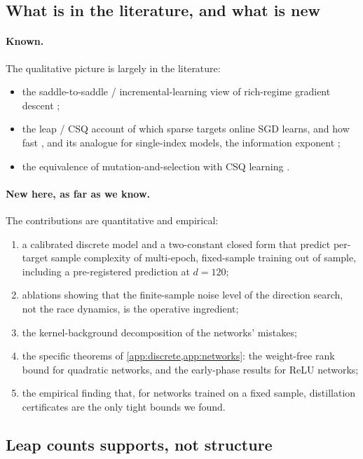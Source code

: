 \subsection{What is in the literature, and what is new}

\paragraph{Known.} The qualitative picture is largely in the literature:
\begin{itemize}
\item the saddle-to-saddle / incremental-learning view of rich-regime gradient descent \cite{pesme2023saddle,jacot2021saddle,li2021greedy,kunin2025agf,bantzis2025saddle};
\item the leap / CSQ account of which sparse targets online SGD learns, and how fast \cite{abbe2022msp,abbe2023leap}, and its analogue for single-index models, the information exponent \cite{benarous2021online};
\item the equivalence of mutation-and-selection with CSQ learning \cite{feldman2008evolvability}.
\end{itemize}

\paragraph{New here, as far as we know.} The contributions are quantitative and empirical:
\begin{enumerate}
\item a calibrated discrete model and a two-constant closed form that predict per-target sample complexity of multi-epoch, fixed-sample training out of sample, including a pre-registered prediction at $d=120$;
\item ablations showing that the finite-sample noise level of the direction search, not the race dynamics, is the operative ingredient;
\item the kernel-background decomposition of the networks' mistakes;
\item the specific theorems of \cref{app:discrete,app:networks}: the weight-free rank bound for quadratic networks, and the early-phase results for ReLU networks;
\item the empirical finding that, for networks trained on a fixed sample, distillation certificates are the only tight bounds we found.
\end{enumerate}

\subsection{Leap counts supports, not structure}\label{sec:leapcritique}

